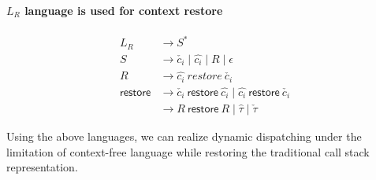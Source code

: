 \paragraph{\bf $L_R$ language is used for context restore}
\begin{equation}
    \begin{split}
L_{R} & \longrightarrow S^*\\
S & \longrightarrow \check{c_i} \mid \hat{c_i} \mid  R \mid \epsilon\\
R & \longrightarrow \hat{\boxed{c_i}} ~ restore ~ \check{\boxed{c_i}}\\
\textsf{restore} & \longrightarrow \check{c_i} ~ \textsf{restore} ~ \hat{c_i} \mid 
\hat{c_i} ~ \textsf{restore} ~ \check{c_i} \\
& \longrightarrow R ~ \textsf{restore} ~ R \mid \hat{\tau} \mid \check{\tau}
    \end{split}
\end{equation}

Using the above languages, we can realize dynamic dispatching under the limitation of context-free language while restoring the traditional call stack representation.